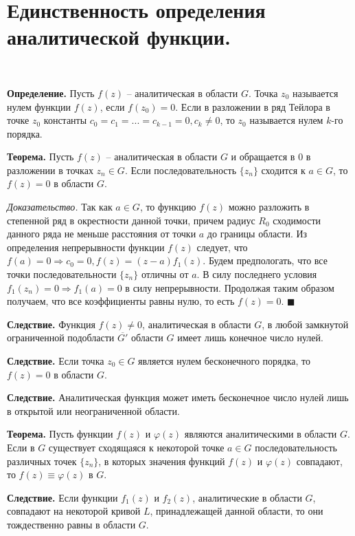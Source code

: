 \documentclass[9pt]{article}
\begin{document}
\section{Единственность определения аналитической функции.}

\ 
\par\textbf{Определение.} Пусть \(f(z)\) -- аналитическая в области \(G\). Точка \(z_0\) называется нулем функции \(f(z)\), если \(f(z_0)=0\). Если в разложении в ряд Тейлора в точке \(z_0\) константы \(c_0=c_1=...=c_{k-1}=0,c_k\neq0\), то \(z_0\) называется нулем \(k\)-го порядка.
\par\textbf{Теорема.} Пусть \(f(z)\) -- аналитическая в области \(G\) и обращается в 0 в разложении в точках \(z_n\in G\). Если последовательность \(\{z_n\}\) сходится к \(a\in G\), то \(f(z)=0\) в области \(G\).
\par\textit{Доказательство.} Так как \(a\in G\), то функцию \(f(z)\) можно разложить в степенной ряд в окрестности данной точки, причем радиус \(R_0\) сходимости данного ряда не меньше расстояния от точки \(a\) до границы области. Из определения непрерывности функции \(f(z)\) следует, что \(f(a)=0\Rightarrow c_0=0, f(z)=(z-a)f_1(z)\). Будем предпологать, что все точки последовательности \(\{z_n\}\) отличны от \(a\). В силу последнего условия \(f_1(z_n)=0\Rightarrow f_1(a)=0\) в силу непрерывности. Продолжая таким образом получаем, что все коэффициенты равны нулю, то есть \(f(z)=0\). \(\blacksquare\)
\par\textbf{Следствие.} Функция \(f(z)\neq0\), аналитическая в области \(G\), в любой замкнутой ограниченной подобласти \(\overline{G'}\) области \(G\) имеет лишь конечное число нулей.
\par\textbf{Следствие.} Если точка \(z_0\in G\) является нулем бесконечного порядка, то \(f(z)=0\) в области \(G\).
\par\textbf{Следствие.} Аналитическая функция может иметь бесконечное число нулей лишь в открытой или неограниченной области.
\par\textbf{Теорема.} Пусть функции \(f(z)\) и \(\varphi(z)\) являются аналитическими в области \(G\). Если в \(G\) существует сходящаяся к некоторой точке \(a\in G\) последовательность различных точек \(\{z_n\}\), в которых значения функций \(f(z)\) и \(\varphi(z)\) совпадают, то \(f(z)\equiv\varphi(z)\) в \(G\).
\par\textbf{Следствие.} Если функции \(f_1(z)\) и \(f_2(z)\), аналитические в области \(G\), совпадают на некоторой кривой \(L\), принадлежащей данной области, то они тождественно равны в области \(G\).
\end{document}
